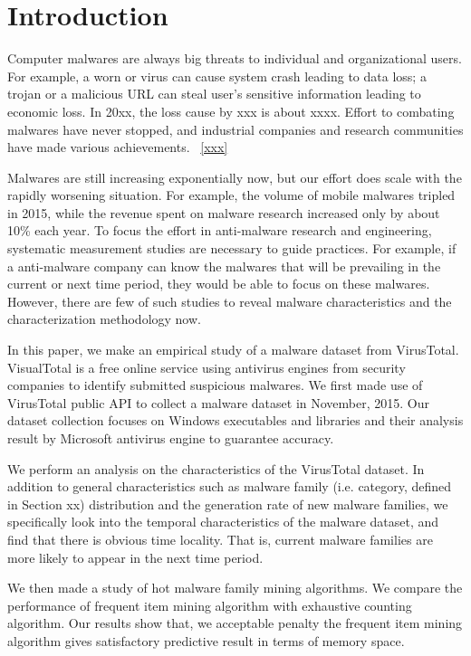 \section{Introduction}

Computer malwares are always big threats to individual and organizational users. For example, a worn or virus can cause system crash leading to data loss; a trojan or a malicious URL can steal user's sensitive  information leading to economic loss. In 20xx, the loss cause by xxx is about xxxx. Effort to combating malwares have never stopped, and industrial companies and research communities have made various achievements. ~\ref{xxx}

Malwares are still increasing exponentially now, but our effort does scale with the rapidly worsening situation. For example, the volume of mobile malwares tripled in 2015, while the revenue spent on malware research increased only by about 10\% each year. 
To focus the effort in anti-malware research and engineering, systematic measurement studies are necessary to guide practices. For example, if a anti-malware company can know the malwares that will be prevailing in the current or next time period, they would be able to focus on these malwares.
However, there are few of such studies to reveal malware characteristics and the characterization methodology now. 

In this paper, we make an empirical study of a malware dataset from VirusTotal. VisualTotal is a free online service using antivirus engines from security companies to identify submitted suspicious malwares.
We first made use of VirusTotal public API to collect a malware dataset in November, 2015. Our dataset collection focuses on Windows executables and libraries and their analysis result by Microsoft antivirus engine to guarantee accuracy. 

We perform an analysis on the characteristics of the VirusTotal dataset. In addition to general characteristics such as malware family (i.e. category, defined in Section xx) distribution and the generation rate of new malware families, we specifically look into the temporal characteristics of the malware dataset, and find that there is obvious time locality. That is, current malware families are more likely to appear in the next time period.

We then made a study of hot malware family mining algorithms. We compare the performance of frequent item mining algorithm with exhaustive counting algorithm. Our results show that, we acceptable penalty the frequent item mining algorithm gives satisfactory predictive result in terms of memory space. 

